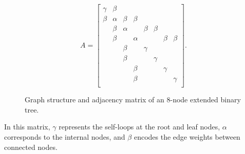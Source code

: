\documentclass{article}
\begin{document}
    \begin{figure}[htbp]
        \centering
        \begin{minipage}{0.35\textwidth}
            \centering
        \end{minipage}
        \hfill
        \begin{minipage}{0.6\textwidth}
            \centering
            \begin{equation}
                A =
                \begin{bmatrix}
                    \gamma & \beta \\
                    \beta & \alpha & \beta & \beta \\
                    & \beta & \alpha & & \beta & \beta \\
                    & \beta & & \alpha & & & \beta & \beta  \\
                    & & \beta & & \gamma \\
                    & & \beta & & & \gamma \\
                    & & & \beta & & & \gamma \\
                    &       & & \beta  & & &       & \gamma \\
                \end{bmatrix}.
            \end{equation}
        \end{minipage}
        \caption{Graph structure and adjacency matrix of an 8-node extended binary tree.}
        \label{fig:figure}
    \end{figure}

    In this matrix, $\gamma$ represents the self-loops at the root and leaf nodes, $\alpha$ corresponds to the internal nodes, and $\beta$ encodes the edge weights between connected nodes.
\end{document}
